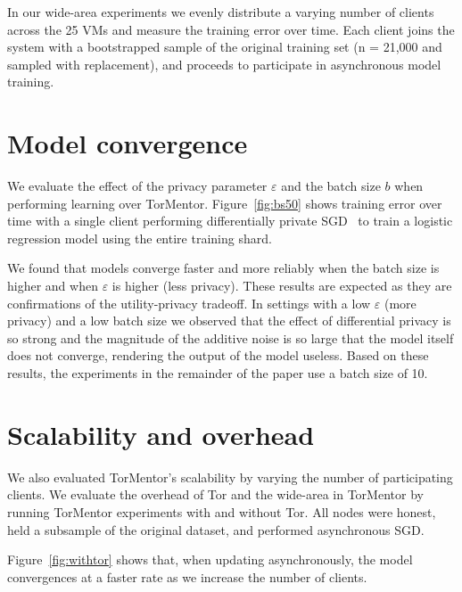 In our wide-area experiments we evenly distribute a varying number of
clients across the 25 VMs and measure the training error over
time. Each client joins the system with a bootstrapped sample of the
original training set (n = 21,000 and sampled with replacement), and
proceeds to participate in asynchronous model training.


\section{Model convergence}
\label{eval:diffpriv}

We evaluate the effect of the privacy parameter $\varepsilon$ and the
batch size $b$ when performing learning over TorMentor. 
Figure~\ref{fig:bs50} shows training error over time with a single
client performing differentially private SGD~\cite{Song:2013} to
train a logistic regression model using the entire training shard.

We found that models converge faster and more reliably when the batch
size is higher and when $\varepsilon$ is higher (less privacy). These
results are expected as they are confirmations of the utility-privacy
tradeoff. In settings with a low $\varepsilon$ (more privacy) and a low
batch size we observed that the effect of differential privacy is so
strong and the magnitude of the additive noise is so large that the
model itself does not converge, rendering the output of the model
useless. Based on these results, the experiments in the remainder of the
paper use a batch size of 10.


\section{Scalability and overhead}
\label{eval:overhead}

We also evaluated TorMentor's scalability by varying the number of
participating clients. We evaluate the overhead of Tor and the
wide-area in TorMentor by running TorMentor experiments with and
without Tor. All nodes were honest, held a subsample of the original
dataset, and performed asynchronous SGD.

Figure~\ref{fig:withtor} shows that, when updating asynchronously, the
model convergences at a faster rate as we increase the number of
clients.

